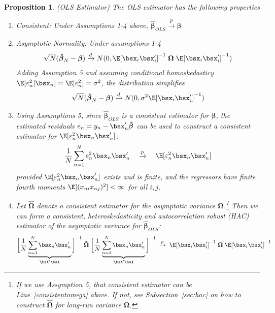 \documentclass[12pt]{article}
\theoremstyle{plain}
\newtheorem{prop}[thm]{Proposition}
\theoremstyle{definition}
\theoremstyle{remark}
\newcommand{\bsbeta}{\boldsymbol{\beta}}
\newcommand{\bsOmega}{\boldsymbol{\Omega}}
\newcommand{\bshatbeta}{\boldsymbol{\hat{\beta}}}
\newcommand{\bshatOmega}{\boldsymbol{\hat{\Omega}}}
\newcommand{\pto}{\xrightarrow{p}}
\newcommand{\dto}{\xrightarrow{d}}
\newcommand{\sumnN}{\sum^N_{n=1}}
\begin{document}
\begin{prop}\emph{(OLS Estimator)}
The OLS estimator has the following properties
\begin{enumerate}
  \item \emph{Consistent}: Under Assumptions 1-4 above,
    $\bshatbeta_{OLS}\pto \bsbeta$
  \item \emph{Asymptotic Normality}: Under assumptions 1-4
    \begin{align*}
      \sqrt{N}(\bshatbeta_N- \bsbeta) \dto
      N(0,\E[\bsx_i\bsx_i']^{-1}\;\bsOmega\;\E[\bsx_i\bsx_i']^{-1})
    \end{align*}
    Adding Assumption 5 and assuming conditional homoskedasticy
    $\E[\varepsilon_n^2|\bsx_n]=\E[\varepsilon_n^2]=\sigma^2$, the
    distribution simplifies
    \begin{align*}
      \sqrt{N}(\bshatbeta_N- \bsbeta) \dto
      N(0,\sigma^2\E[\bsx_i\bsx_i']^{-1})
    \end{align*}

  \item Using Assumptions 5, since $\bshatbeta_{OLS}$ is a consistent
    estimator for $\bsbeta$, the estimated residuals
    $e_n = y_n - \bsx_n' \bshatbeta$ can be used to construct a
    consistent estimator for $\E[\varepsilon_n^2\bsx_n\bsx_n']$:
    \begin{align}
      \frac{1}{N} \sumnN e^2_n \bsx_n \bsx_n'
      \quad\pto\quad
      \E[\varepsilon_n^2\bsx_n\bsx_n']
      \label{consistentomega}
    \end{align}
    provided $\E[\varepsilon_n^2\bsx_n\bsx_n']$ exists and is finite,
    and the regressors have finite fourth moments
    $\E[(x_{ni}x_{nj})^2]<\infty$ for all $i,j$.

  \item
    Let $\bshatOmega$ denote a consistent estimator for the asymptotic
    variance $\bsOmega$.\footnote{%
      If we use Assymption 5, that consistent estimator can be
      Line~\ref{consistentomega} above. If not, see
      Subsection~\ref{sec:hac} on how to construct $\bshatOmega$ for
      long-run variance $\bsOmega$.
    }
    Then we can form a consistent, heteroskedasticity and
    autocorrelation robust (HAC) estimator of the asymptotic variance
    for $\bshatbeta_{OLS}$:
    \begin{align*}
      \bigg[
        \frac{1}{N} \underbrace{\sumnN \bsx_n\bsx_n'}_{\bsX'\bsX}
      \bigg]^{-1}
      \;
      \bshatOmega\;
      \bigg[
        \frac{1}{N} \underbrace{\sumnN \bsx_n\bsx_n'}_{\bsX'\bsX}
      \bigg]^{-1}
      \;\pto\;
      \E[\bsx_i\bsx_i']^{-1}\;\bsOmega\;\E[\bsx_i\bsx_i']^{-1}
    \end{align*}


\end{enumerate}
\end{prop}
\end{document}
